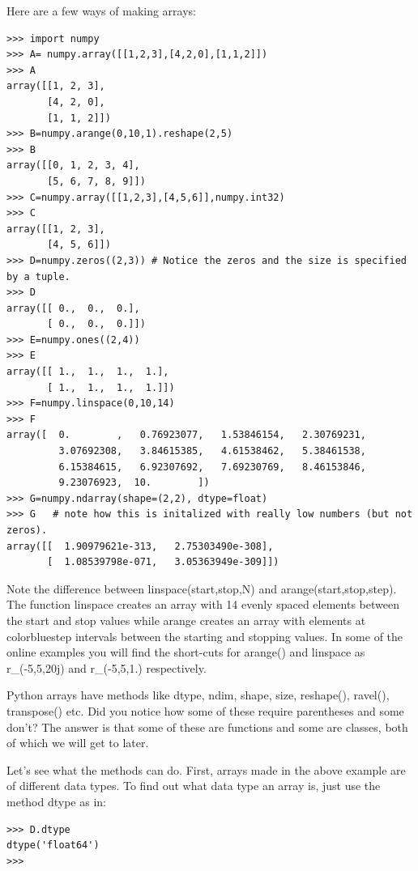 \documentclass[11pt]{book}
\begin{document}
{ Here are a few ways of making arrays:  
{ \color{blue} \begin{verbatim}
>>> import numpy
>>> A= numpy.array([[1,2,3],[4,2,0],[1,1,2]])
>>> A
array([[1, 2, 3],
       [4, 2, 0],
       [1, 1, 2]])
>>> B=numpy.arange(0,10,1).reshape(2,5)
>>> B
array([[0, 1, 2, 3, 4],
       [5, 6, 7, 8, 9]])
>>> C=numpy.array([[1,2,3],[4,5,6]],numpy.int32) 
>>> C
array([[1, 2, 3],
       [4, 5, 6]])
>>> D=numpy.zeros((2,3)) # Notice the zeros and the size is specified by a tuple.
>>> D
array([[ 0.,  0.,  0.],
       [ 0.,  0.,  0.]])
>>> E=numpy.ones((2,4))
>>> E
array([[ 1.,  1.,  1.,  1.],
       [ 1.,  1.,  1.,  1.]])
>>> F=numpy.linspace(0,10,14)
>>> F
array([  0.        ,   0.76923077,   1.53846154,   2.30769231,
         3.07692308,   3.84615385,   4.61538462,   5.38461538,
         6.15384615,   6.92307692,   7.69230769,   8.46153846,
         9.23076923,  10.        ])      
>>> G=numpy.ndarray(shape=(2,2), dtype=float) 
>>> G   # note how this is initalized with really low numbers (but not zeros).
array([[  1.90979621e-313,   2.75303490e-308],
       [  1.08539798e-071,   3.05363949e-309]])         
\end{verbatim}}

Note the difference between {\color{blue}linspace(start,stop,N)} and {\color{blue}arange(start,stop,step)}. The function {\color{blue}linspace} creates an array with 14 evenly spaced elements between the start and stop values while  {\color{blue}arange} creates an array with elements at {color{blue}step} intervals between the starting and stopping values.    In some of the online examples you will find the short-cuts for {\color{blue}arange()} and {\color{blue}linspace} as  {\color{blue}r\_(-5,5,20j)} and {\color{blue}r\_(-5,5,1.)} respectively.

Python arrays have methods like {\color{blue}dtype},  {\color{blue}ndim}, {\color{blue}shape}, {\color{blue}size}, {\color{blue}reshape()}, {\color{blue}ravel()},  {\color{blue}transpose()} etc.    Did you notice how some of these require parentheses and some don't? The answer is that some of these are functions and some are classes, both of which we will get to later.  

Let's see what the methods can do. 
First,  arrays made in the above example are of different data types. To find out what data type an array is, just use the method {\color{blue}dtype} as in:

{ \color{blue} \begin{verbatim}
>>> D.dtype
dtype('float64')
>>>
\end{verbatim}}



}
\end{document}
